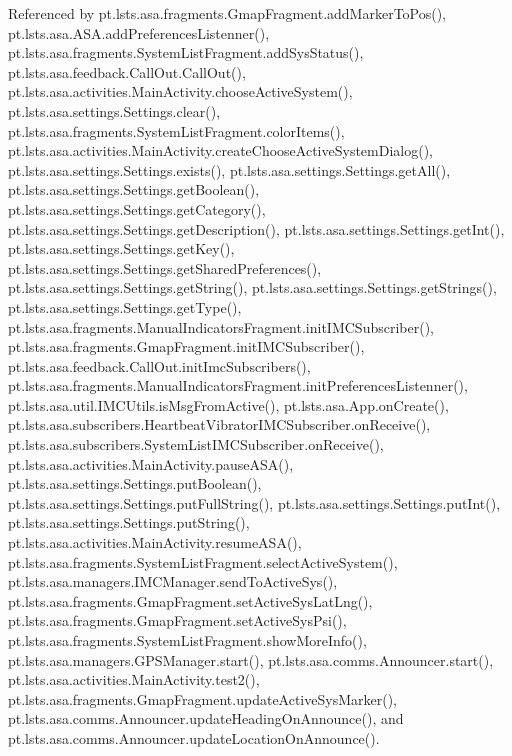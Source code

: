 Referenced by pt.\+lsts.\+asa.\+fragments.\+Gmap\+Fragment.\+add\+Marker\+To\+Pos(), pt.\+lsts.\+asa.\+A\+S\+A.\+add\+Preferences\+Listenner(), pt.\+lsts.\+asa.\+fragments.\+System\+List\+Fragment.\+add\+Sys\+Status(), pt.\+lsts.\+asa.\+feedback.\+Call\+Out.\+Call\+Out(), pt.\+lsts.\+asa.\+activities.\+Main\+Activity.\+choose\+Active\+System(), pt.\+lsts.\+asa.\+settings.\+Settings.\+clear(), pt.\+lsts.\+asa.\+fragments.\+System\+List\+Fragment.\+color\+Items(), pt.\+lsts.\+asa.\+activities.\+Main\+Activity.\+create\+Choose\+Active\+System\+Dialog(), pt.\+lsts.\+asa.\+settings.\+Settings.\+exists(), pt.\+lsts.\+asa.\+settings.\+Settings.\+get\+All(), pt.\+lsts.\+asa.\+settings.\+Settings.\+get\+Boolean(), pt.\+lsts.\+asa.\+settings.\+Settings.\+get\+Category(), pt.\+lsts.\+asa.\+settings.\+Settings.\+get\+Description(), pt.\+lsts.\+asa.\+settings.\+Settings.\+get\+Int(), pt.\+lsts.\+asa.\+settings.\+Settings.\+get\+Key(), pt.\+lsts.\+asa.\+settings.\+Settings.\+get\+Shared\+Preferences(), pt.\+lsts.\+asa.\+settings.\+Settings.\+get\+String(), pt.\+lsts.\+asa.\+settings.\+Settings.\+get\+Strings(), pt.\+lsts.\+asa.\+settings.\+Settings.\+get\+Type(), pt.\+lsts.\+asa.\+fragments.\+Manual\+Indicators\+Fragment.\+init\+I\+M\+C\+Subscriber(), pt.\+lsts.\+asa.\+fragments.\+Gmap\+Fragment.\+init\+I\+M\+C\+Subscriber(), pt.\+lsts.\+asa.\+feedback.\+Call\+Out.\+init\+Imc\+Subscribers(), pt.\+lsts.\+asa.\+fragments.\+Manual\+Indicators\+Fragment.\+init\+Preferences\+Listenner(), pt.\+lsts.\+asa.\+util.\+I\+M\+C\+Utils.\+is\+Msg\+From\+Active(), pt.\+lsts.\+asa.\+App.\+on\+Create(), pt.\+lsts.\+asa.\+subscribers.\+Heartbeat\+Vibrator\+I\+M\+C\+Subscriber.\+on\+Receive(), pt.\+lsts.\+asa.\+subscribers.\+System\+List\+I\+M\+C\+Subscriber.\+on\+Receive(), pt.\+lsts.\+asa.\+activities.\+Main\+Activity.\+pause\+A\+S\+A(), pt.\+lsts.\+asa.\+settings.\+Settings.\+put\+Boolean(), pt.\+lsts.\+asa.\+settings.\+Settings.\+put\+Full\+String(), pt.\+lsts.\+asa.\+settings.\+Settings.\+put\+Int(), pt.\+lsts.\+asa.\+settings.\+Settings.\+put\+String(), pt.\+lsts.\+asa.\+activities.\+Main\+Activity.\+resume\+A\+S\+A(), pt.\+lsts.\+asa.\+fragments.\+System\+List\+Fragment.\+select\+Active\+System(), pt.\+lsts.\+asa.\+managers.\+I\+M\+C\+Manager.\+send\+To\+Active\+Sys(), pt.\+lsts.\+asa.\+fragments.\+Gmap\+Fragment.\+set\+Active\+Sys\+Lat\+Lng(), pt.\+lsts.\+asa.\+fragments.\+Gmap\+Fragment.\+set\+Active\+Sys\+Psi(), pt.\+lsts.\+asa.\+fragments.\+System\+List\+Fragment.\+show\+More\+Info(), pt.\+lsts.\+asa.\+managers.\+G\+P\+S\+Manager.\+start(), pt.\+lsts.\+asa.\+comms.\+Announcer.\+start(), pt.\+lsts.\+asa.\+activities.\+Main\+Activity.\+test2(), pt.\+lsts.\+asa.\+fragments.\+Gmap\+Fragment.\+update\+Active\+Sys\+Marker(), pt.\+lsts.\+asa.\+comms.\+Announcer.\+update\+Heading\+On\+Announce(), and pt.\+lsts.\+asa.\+comms.\+Announcer.\+update\+Location\+On\+Announce().

